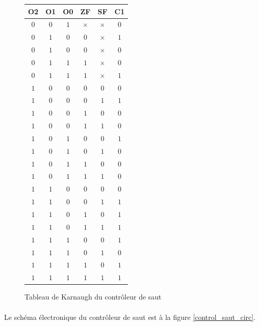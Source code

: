 \begin{figure}
	\centering
	\begin{tabular}{|c|c|c|c|c|c|}
		\hline 
		O2 & O1 & O0 & ZF & SF & C1 \\ 
		\hline 
		$0$ & $0$ & $1$ & $\times$ & $\times$ & $0$ \\ 
		\hline 
		$0$ & $1$ & $0$ & $0$ & $\times$ & $1$ \\ 
		\hline 
		$0$ & $1$ & $0$ & $0$ & $\times$ & $0$ \\ 
		\hline 
		$0$ & $1$ & $1$ & $1$ & $\times$ & $0$ \\ 
		\hline 
		$0$ & $1$ & $1$ & $1$ & $\times$ & $1$ \\ 
		\hline 
		$1$ & $0$ & $0$ & $0$ & $0$ & $0$ \\ 
		\hline 
		$1$ & $0$ & $0$ & $0$ & $1$ & $1$ \\ 
		\hline 
		$1$ & $0$ & $0$ & $1$ & $0$ & $0$ \\ 
		\hline 
		$1$ & $0$ & $0$ & $1$ & $1$ & $0$ \\ 
		\hline 
		$1$ & $0$ & $1$ & $0$ & $0$ & $1$ \\ 
		\hline 
		$1$ & $0$ & $1$ & $0$ & $1$ & $0$ \\ 
		\hline 
		$1$ & $0$ & $1$ & $1$ & $0$ & $0$ \\ 
		\hline 
		$1$ & $0$ & $1$ & $1$ & $1$ & $0$ \\ 
		\hline 
		$1$ & $1$ & $0$ & $0$ & $0$ & $0$ \\ 
		\hline 
		$1$ & $1$ & $0$ & $0$ & $1$ & $1$ \\ 
		\hline 
		$1$ & $1$ & $0$ & $1$ & $0$ & $1$ \\ 
		\hline 
		$1$ & $1$ & $0$ & $1$ & $1$ & $1$ \\ 
		\hline 
		$1$ & $1$ & $1$ & $0$ & $0$ & $1$ \\ 
		\hline 
		$1$ & $1$ & $1$ & $0$ & $1$ & $0$ \\ 
		\hline 
		$1$ & $1$ & $1$ & $1$ & $0$ & $1$ \\ 
		\hline 
		$1$ & $1$ & $1$ & $1$ & $1$ & $1$ \\ 
		\hline 
	\end{tabular} 
	\label{karnaugh_ctrl_saut}
	\caption{Tableau de Karnaugh du contrôleur de saut}
\end{figure}

\paragraph{}{
	Le schéma électronique du contrôleur de saut est à la figure
	\ref{control_saut_circ}. 
}